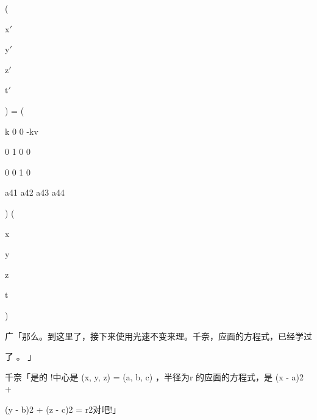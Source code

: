 (\par
x$\prime$\par
y$\prime$\par
z$\prime$\par
t$\prime$\par
) = (\par
k 0 0 -kv\par
0 1 0 0\par
0 0 1 0\par
a41 a42 a43 a44\par
) (\par
x\par
y\par
z\par
t\par
)\par
广「那么。到这里了，接下来使用光速不变来理。千奈，应面的方程式，已经学过\par
了 。 」\par
千奈「是的 !中心是 (x, y, z) = (a, b, c) ，半径为r 的应面的方程式，是 (x - a)2 +\par
(y - b)2 + (z - c)2 = r2对吧!」\par

